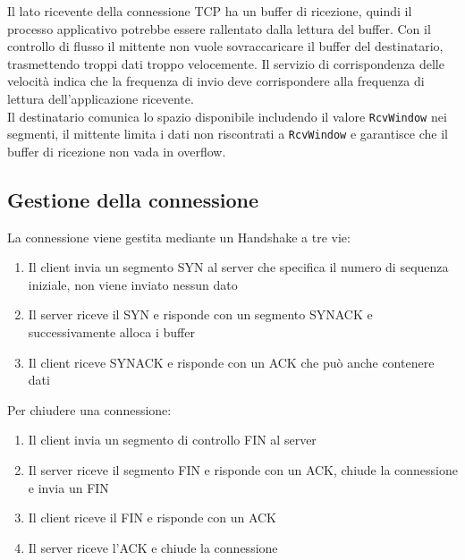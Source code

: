 \documentclass{report}
\begin{document}
	Il lato ricevente della connessione TCP ha un buffer di ricezione, quindi il processo applicativo potrebbe essere rallentato dalla lettura del buffer. Con il controllo di flusso il mittente non vuole sovraccaricare il buffer del destinatario, trasmettendo troppi dati troppo velocemente. Il servizio di corrispondenza delle velocità indica che la frequenza di invio deve corrispondere alla frequenza di lettura dell'applicazione ricevente.
	\medskip\\Il destinatario comunica lo spazio disponibile includendo il valore \verb|RcvWindow| nei segmenti, il mittente limita i dati non riscontrati a \verb|RcvWindow| e garantisce che il buffer di ricezione non vada in overflow.
	
	\subsection{Gestione della connessione}
	La connessione viene gestita mediante un Handshake a tre vie:
	\begin{enumerate}
		\item Il client invia un segmento SYN al server che specifica il numero di sequenza iniziale, non viene inviato nessun dato
		\item Il server riceve il SYN e risponde con un segmento SYNACK e successivamente alloca i buffer
		\item Il client riceve SYNACK e risponde con un ACK che può anche contenere dati
	\end{enumerate}
	Per chiudere una connessione:
	\begin{enumerate}
		\item Il client invia un segmento di controllo FIN al server
		\item Il server riceve il segmento FIN e risponde con un ACK, chiude la connessione e invia un FIN
		\item Il client riceve il FIN e risponde con un ACK
		\item Il server riceve l'ACK e chiude la connessione
	\end{enumerate}
	
\end{document}
